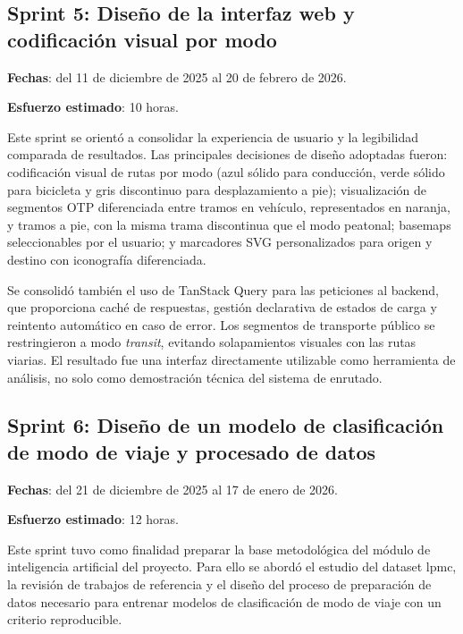 \subsection{Sprint 5: Diseño de la interfaz web y codificación visual por modo}

\textbf{Fechas}: del 11 de diciembre de 2025 al 20 de febrero de 2026.

\textbf{Esfuerzo estimado}: 10 horas.\newline

Este sprint se orientó a consolidar la experiencia de usuario y la legibilidad comparada de resultados. Las principales decisiones de diseño adoptadas fueron: codificación visual de rutas por modo (azul sólido para conducción, verde sólido para bicicleta y gris discontinuo para desplazamiento a pie); visualización de segmentos OTP diferenciada entre tramos en vehículo, representados en naranja, y tramos a pie, con la misma trama discontinua que el modo peatonal; basemaps seleccionables por el usuario; y marcadores SVG personalizados para origen y destino con iconografía diferenciada.\newline

Se consolidó también el uso de TanStack Query para las peticiones al backend, que proporciona caché de respuestas, gestión declarativa de estados de carga y reintento automático en caso de error. Los segmentos de transporte público se restringieron a modo \textit{transit}, evitando solapamientos visuales con las rutas viarias. El resultado fue una interfaz directamente utilizable como herramienta de análisis, no solo como demostración técnica del sistema de enrutado.\newline

\subsection{Sprint 6: Diseño de un modelo de clasificación de modo de viaje y procesado de datos}

\textbf{Fechas}: del 21 de diciembre de 2025 al 17 de enero de 2026.

\textbf{Esfuerzo estimado}: 12 horas.\newline

Este sprint tuvo como finalidad preparar la base metodológica del módulo de inteligencia artificial del proyecto. Para ello se abordó el estudio del dataset \gls{lpmc}, la revisión de trabajos de referencia y el diseño del proceso de preparación de datos necesario para entrenar modelos de clasificación de modo de viaje con un criterio reproducible.\newline

